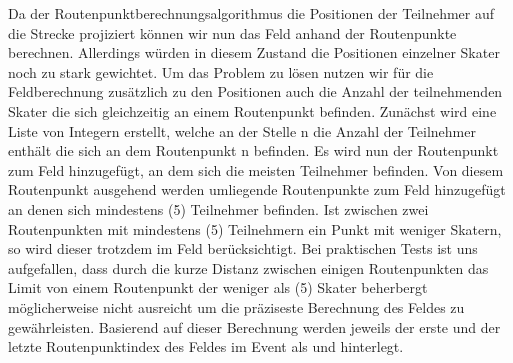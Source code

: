 Da der Routenpunktberechnungsalgorithmus die Positionen der Teilnehmer auf die Strecke projiziert können wir nun das Feld anhand der Routenpunkte berechnen. Allerdings würden in diesem Zustand die Positionen einzelner Skater noch zu stark gewichtet. Um das Problem zu lösen nutzen wir für die Feldberechnung zusätzlich zu den Positionen auch die Anzahl der teilnehmenden Skater die sich gleichzeitig an einem Routenpunkt befinden.
Zunächst wird eine Liste von Integern erstellt, welche an der Stelle n die Anzahl der Teilnehmer enthält die sich an dem Routenpunkt n befinden. Es wird nun der Routenpunkt zum Feld hinzugefügt, an dem sich die meisten Teilnehmer befinden. Von diesem Routenpunkt ausgehend werden umliegende Routenpunkte zum Feld hinzugefügt an denen sich mindestens  (5) Teilnehmer befinden. Ist zwischen zwei Routenpunkten mit mindestens  (5) Teilnehmern ein Punkt mit weniger Skatern, so wird dieser trotzdem im Feld berücksichtigt. Bei praktischen Tests ist uns aufgefallen, dass durch die kurze Distanz zwischen einigen Routenpunkten das Limit von einem Routenpunkt der weniger als  (5) Skater beherbergt möglicherweise nicht ausreicht um die präziseste Berechnung des Feldes zu gewährleisten. Basierend auf dieser Berechnung werden jeweils der erste und der letzte Routenpunktindex des Feldes im Event als  und  hinterlegt.